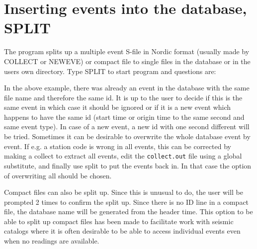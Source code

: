 
\section{Inserting events into the database, SPLIT}
\label{sect:split}

 The program splits up a multiple event S-file in Nordic format (usually made by COLLECT or NEWEVE) or compact file to single files in the database or in the users own directory. Type SPLIT to start program and questions are: 



In the above example, there was already an event in the database with the same file name and therefore the same id. It is up to the user to decide if this is the same event in which case it should be ignored or if it is a new event which happens to have the same id (start time or origin time to the same second and same event type). In case of a new event, a new id with one second different will be tried. Sometimes it can be desirable to overwrite the whole database event by event. If e.g. a station code is wrong in all events, this can be corrected by making a collect to extract all events, edit the \texttt{collect.out} file using a global substitute, and finally use split to put the events back in. In that case the option of overwriting all should be chosen. 

Compact files can also be split up. Since this is unusual to do, the user will be prompted 2 times to confirm the split up. Since there is no ID line in a compact file, the database name will be generated from the header time. This option to be able to split up compact files has been made to facilitate work with seismic catalogs where it is often desirable to be able to access individual events even when no readings are available. 

